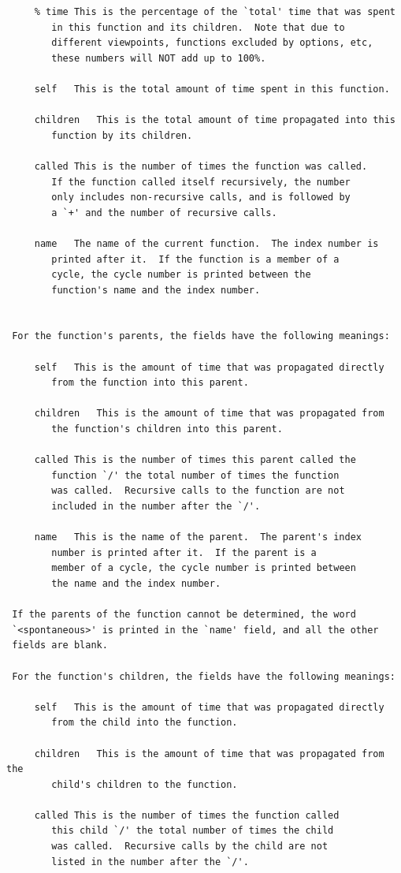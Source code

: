 \documentclass{report}
\begin{document}
\begin{verbatim}
     % time	This is the percentage of the `total' time that was spent
		in this function and its children.  Note that due to
		different viewpoints, functions excluded by options, etc,
		these numbers will NOT add up to 100%.

     self	This is the total amount of time spent in this function.

     children	This is the total amount of time propagated into this
		function by its children.

     called	This is the number of times the function was called.
		If the function called itself recursively, the number
		only includes non-recursive calls, and is followed by
		a `+' and the number of recursive calls.

     name	The name of the current function.  The index number is
		printed after it.  If the function is a member of a
		cycle, the cycle number is printed between the
		function's name and the index number.


 For the function's parents, the fields have the following meanings:

     self	This is the amount of time that was propagated directly
		from the function into this parent.

     children	This is the amount of time that was propagated from
		the function's children into this parent.

     called	This is the number of times this parent called the
		function `/' the total number of times the function
		was called.  Recursive calls to the function are not
		included in the number after the `/'.

     name	This is the name of the parent.  The parent's index
		number is printed after it.  If the parent is a
		member of a cycle, the cycle number is printed between
		the name and the index number.

 If the parents of the function cannot be determined, the word
 `<spontaneous>' is printed in the `name' field, and all the other
 fields are blank.

 For the function's children, the fields have the following meanings:

     self	This is the amount of time that was propagated directly
		from the child into the function.

     children	This is the amount of time that was propagated from the
		child's children to the function.

     called	This is the number of times the function called
		this child `/' the total number of times the child
		was called.  Recursive calls by the child are not
		listed in the number after the `/'.


\end{verbatim}
\end{document}
